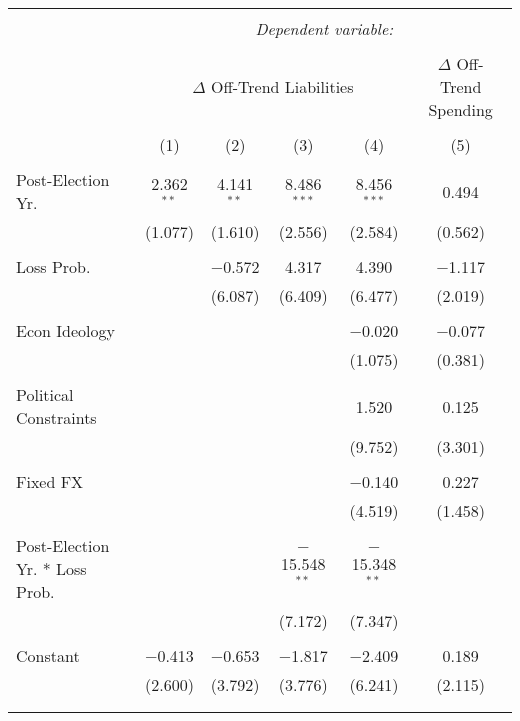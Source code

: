 
\begingroup 
\tiny 
\begin{tabular}{@{\extracolsep{5pt}}lccccc} 
\\[-1.8ex]\hline 
\hline \\[-1.8ex] 
 & \multicolumn{5}{c}{\textit{Dependent variable:}} \\ 
\cline{2-6} 
\\[-1.8ex] & \multicolumn{4}{c}{$\Delta$ Off-Trend Liabilities} & $\Delta$ Off-Trend Spending \\ 
\\[-1.8ex] & (1) & (2) & (3) & (4) & (5)\\ 
\hline \\[-1.8ex] 
 Post-Election Yr. & 2.362$^{**}$ & 4.141$^{**}$ & 8.486$^{***}$ & 8.456$^{***}$ & 0.494 \\ 
  & (1.077) & (1.610) & (2.556) & (2.584) & (0.562) \\ 
  & & & & & \\ 
 Loss Prob. &  & $-$0.572 & 4.317 & 4.390 & $-$1.117 \\ 
  &  & (6.087) & (6.409) & (6.477) & (2.019) \\ 
  & & & & & \\ 
 Econ Ideology &  &  &  & $-$0.020 & $-$0.077 \\ 
  &  &  &  & (1.075) & (0.381) \\ 
  & & & & & \\ 
 Political Constraints &  &  &  & 1.520 & 0.125 \\ 
  &  &  &  & (9.752) & (3.301) \\ 
  & & & & & \\ 
 Fixed FX &  &  &  & $-$0.140 & 0.227 \\ 
  &  &  &  & (4.519) & (1.458) \\ 
  & & & & & \\ 
 Post-Election Yr. * Loss Prob. &  &  & $-$15.548$^{**}$ & $-$15.348$^{**}$ &  \\ 
  &  &  & (7.172) & (7.347) &  \\ 
  & & & & & \\ 
 Constant & $-$0.413 & $-$0.653 & $-$1.817 & $-$2.409 & 0.189 \\ 
  & (2.600) & (3.792) & (3.776) & (6.241) & (2.115) \\ 
  & & & & & \\ 
\hline \\[-1.8ex] 

\end{tabular}
